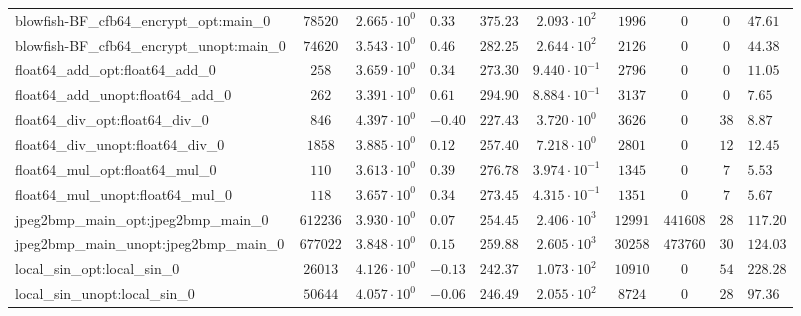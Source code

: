 \begin{tabular}{|l|c|HHc|c|c|c|cH|}
blowfish-BF\_cfb64\_encrypt\_opt:main\_0        & $ 78520    $ & $ 2.665 \cdot 10^{0} $ & $ 0.33  $ & $ 375.23 $ & $ 2.093 \cdot 10^{2}  $ & $ 1996   $ & $ 0       $ & $ 0   $ & $ 47.61   $ \\
blowfish-BF\_cfb64\_encrypt\_unopt:main\_0      & $ 74620    $ & $ 3.543 \cdot 10^{0} $ & $ 0.46  $ & $ 282.25 $ & $ 2.644 \cdot 10^{2}  $ & $ 2126   $ & $ 0       $ & $ 0   $ & $ 44.38   $ \\
float64\_add\_opt:float64\_add\_0               & $ 258      $ & $ 3.659 \cdot 10^{0} $ & $ 0.34  $ & $ 273.30 $ & $ 9.440 \cdot 10^{-1} $ & $ 2796   $ & $ 0       $ & $ 0   $ & $ 11.05   $ \\
float64\_add\_unopt:float64\_add\_0             & $ 262      $ & $ 3.391 \cdot 10^{0} $ & $ 0.61  $ & $ 294.90 $ & $ 8.884 \cdot 10^{-1} $ & $ 3137   $ & $ 0       $ & $ 0   $ & $ 7.65    $ \\
float64\_div\_opt:float64\_div\_0               & $ 846      $ & $ 4.397 \cdot 10^{0} $ & $ -0.40 $ & $ 227.43 $ & $ 3.720 \cdot 10^{0}  $ & $ 3626   $ & $ 0       $ & $ 38  $ & $ 8.87    $ \\
float64\_div\_unopt:float64\_div\_0             & $ 1858     $ & $ 3.885 \cdot 10^{0} $ & $ 0.12  $ & $ 257.40 $ & $ 7.218 \cdot 10^{0}  $ & $ 2801   $ & $ 0       $ & $ 12  $ & $ 12.45   $ \\
float64\_mul\_opt:float64\_mul\_0               & $ 110      $ & $ 3.613 \cdot 10^{0} $ & $ 0.39  $ & $ 276.78 $ & $ 3.974 \cdot 10^{-1} $ & $ 1345   $ & $ 0       $ & $ 7   $ & $ 5.53    $ \\
float64\_mul\_unopt:float64\_mul\_0             & $ 118      $ & $ 3.657 \cdot 10^{0} $ & $ 0.34  $ & $ 273.45 $ & $ 4.315 \cdot 10^{-1} $ & $ 1351   $ & $ 0       $ & $ 7   $ & $ 5.67    $ \\
jpeg2bmp\_main\_opt:jpeg2bmp\_main\_0           & $ 612236   $ & $ 3.930 \cdot 10^{0} $ & $ 0.07  $ & $ 254.45 $ & $ 2.406 \cdot 10^{3}  $ & $ 12991  $ & $ 441608  $ & $ 28  $ & $ 117.20  $ \\
jpeg2bmp\_main\_unopt:jpeg2bmp\_main\_0         & $ 677022   $ & $ 3.848 \cdot 10^{0} $ & $ 0.15  $ & $ 259.88 $ & $ 2.605 \cdot 10^{3}  $ & $ 30258  $ & $ 473760  $ & $ 30  $ & $ 124.03  $ \\
local\_sin\_opt:local\_sin\_0                   & $ 26013    $ & $ 4.126 \cdot 10^{0} $ & $ -0.13 $ & $ 242.37 $ & $ 1.073 \cdot 10^{2}  $ & $ 10910  $ & $ 0       $ & $ 54  $ & $ 228.28  $ \\
local\_sin\_unopt:local\_sin\_0                 & $ 50644    $ & $ 4.057 \cdot 10^{0} $ & $ -0.06 $ & $ 246.49 $ & $ 2.055 \cdot 10^{2}  $ & $ 8724   $ & $ 0       $ & $ 28  $ & $ 97.36   $ \\

\end{tabular}
